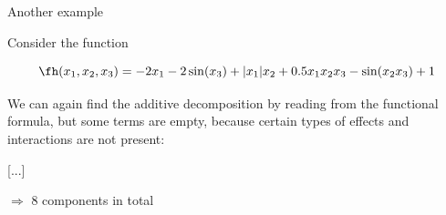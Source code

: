\documentclass[11pt,compress,t,notes=noshow, aspectratio=169, xcolor=table]{beamer}
\begin{document}
\begin{frame}{Another example}

    \begin{example}

        Consider the function

        \begin{equation*}
            \fh(x_1, x_2, x_3) = - 2x_1 - 2\sin(x_3) + |x_1|x_2 + 0.5 x_1 x_2 x_3 - \sin(x_2 x_3) +1
        \end{equation*}

        We can again find the additive decomposition by reading from the functional formula, but some terms are empty, because certain types of effects and interactions are not present:

        [...]

        \(\Rightarrow\) 8 components in total
        
    \end{example}
    
\end{frame}
\end{document}
